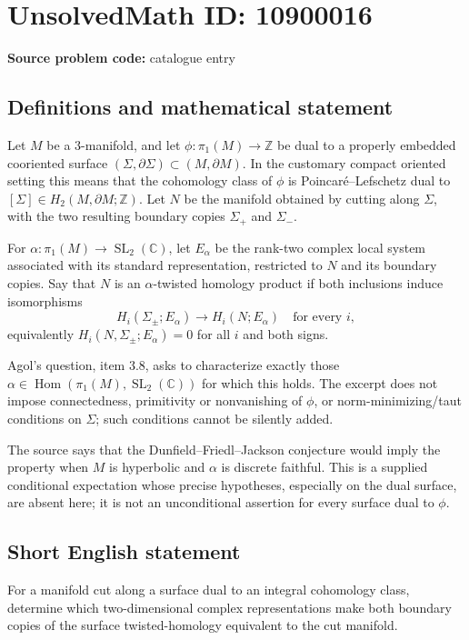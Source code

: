 \documentclass[11pt]{article}
\newcommand{\Z}{\mathbb{Z}}
\newcommand{\C}{\mathbb{C}}
\begin{document}
\section*{UnsolvedMath ID: 10900016}
\textbf{Source problem code:} catalogue entry
\subsection{Definitions and mathematical statement}
Let $M$ be a $3$-manifold, and let $\phi:\pi_1(M)\to\Z$ be dual to a properly embedded cooriented surface $(\Sigma,\partial\Sigma)\subset(M,\partial M)$. In the customary compact oriented setting this means that the cohomology class of $\phi$ is Poincar\'e--Lefschetz dual to $[\Sigma]\in H_2(M,\partial M;\Z)$. Let $N$ be the manifold obtained by cutting along $\Sigma$, with the two resulting boundary copies $\Sigma_+$ and $\Sigma_-$.

For $\alpha:\pi_1(M)\to\operatorname{SL}_2(\C)$, let $E_\alpha$ be the rank-two complex local system associated with its standard representation, restricted to $N$ and its boundary copies. Say that $N$ is an $\alpha$-twisted homology product if both inclusions induce isomorphisms
\[
 H_i(\Sigma_\pm;E_\alpha)\longrightarrow H_i(N;E_\alpha)
 \quad\text{for every }i,
\]
equivalently $H_i(N,\Sigma_\pm;E_\alpha)=0$ for all $i$ and both signs.

Agol's question, item 3.8, asks to characterize exactly those $\alpha\in\operatorname{Hom}(\pi_1(M),\operatorname{SL}_2(\C))$ for which this holds. The excerpt does not impose connectedness, primitivity or nonvanishing of $\phi$, or norm-minimizing/taut conditions on $\Sigma$; such conditions cannot be silently added.

The source says that the Dunfield--Friedl--Jackson conjecture would imply the property when $M$ is hyperbolic and $\alpha$ is discrete faithful. This is a supplied conditional expectation whose precise hypotheses, especially on the dual surface, are absent here; it is not an unconditional assertion for every surface dual to $\phi$.
\subsection{Short English statement}
For a manifold cut along a surface dual to an integral cohomology class, determine which two-dimensional complex representations make both boundary copies of the surface twisted-homology equivalent to the cut manifold.
\end{document}
